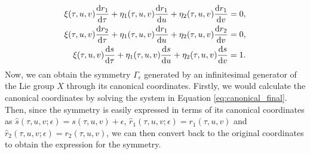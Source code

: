   \begin{equation}
    \begin{split}
     \xi(\tau,u,v)\dv{r_1}{\tau}+\eta_1(\tau,u,v)\dv{r_1}{u}+\eta_2(\tau,u,v)\dv{r_1}{v}&=0,\\
    \xi(\tau,u,v)\dv{r_2}{\tau}+\eta_1(\tau,u,v)\dv{r_1}{u}+\eta_2(\tau,u,v)\dv{r_2}{v}&=0,\\
    \xi(\tau,u,v)\dv{s}{\tau}+\eta_1(\tau,u,v)\dv{s}{u}+\eta_2(\tau,u,v)\dv{s}{v}&=1.\\      
  \end{split}
  \label{eq:canonical_final}
\end{equation}
Now, we can obtain the symmetry $\Gamma_\epsilon$ generated by an infinitesimal generator of the Lie group $X$ through its canonical coordinates. Firstly, we would calculate the canonical coordinates by solving the system in Equation \eqref{eq:canonical_final}. Then, since the symmetry is easily expressed in terms of its canonical coordinates as $\hat{s}(\tau,u,v;\epsilon)=s(\tau,u,v)+\epsilon$, $\hat{r}_1(\tau,u,v;\epsilon)=r_1(\tau,u,v)$ and $\hat{r}_2(\tau,u,v;\epsilon)=r_2(\tau,u,v)$, we can then convert back to the original coordinates to obtain the expression for the symmetry. 